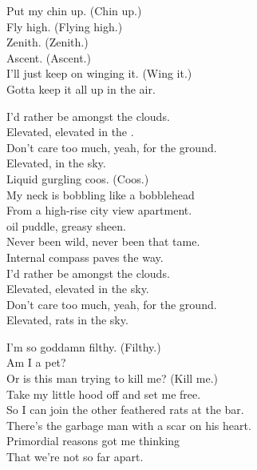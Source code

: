 Put my chin up. (Chin up.) \\
Fly high. (Flying high.) \\
Zenith. (Zenith.) \\
Ascent. (Ascent.) \\
I'll just keep on winging it. (Wing it.) \\
Gotta keep it all up in the air. \\




I'd rather be amongst the clouds. \\
Elevated, elevated in the . \\
Don't care too much, yeah, for the ground. \\
Elevated,  in the sky. \\

Liquid gurgling coos. (Coos.) \\
My neck is bobbling like a bobblehead \\
From a high-rise city view apartment. \\
 oil puddle, greasy sheen. \\
Never been wild, never been that tame. \\
Internal compass paves the way. \\

I'd rather be amongst the clouds. \\
Elevated, elevated in the sky. \\
Don't care too much, yeah, for the ground. \\
Elevated, rats in the sky. \\


I'm so goddamn filthy. (Filthy.) \\
Am I a pet? \\
Or is this man trying to kill me? (Kill me.) \\

Take my little hood off and set me free. \\
So I can join the other feathered rats at the bar. \\
There's the garbage man with a scar on his heart. \\
Primordial reasons got me thinking \\
That we're not so far apart. \\

